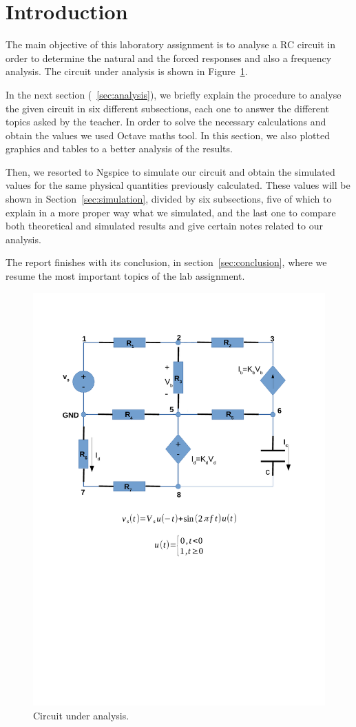 \section{Introduction}
\label{sec:introduction}


The main objective of this laboratory assignment is to analyse a RC circuit in order to determine the natural and the forced responses and also a frequency analysis. The circuit under analysis is shown in Figure~\ref{fig:circuit}.

In the next section (~\ref{sec:analysis}), we briefly explain the procedure to analyse the given circuit in six different subsections, each one to answer the different topics asked by the teacher. In order to solve the necessary calculations and obtain the values we used Octave maths tool. In this section, we also plotted graphics and tables to a better analysis of the results.

Then, we resorted to Ngspice to simulate our circuit and obtain the simulated values for the same physical quantities previously calculated. These values will be shown in Section~\ref{sec:simulation}, divided by six subsections, five of which to explain in a more proper way what we simulated, and the last one to compare both theoretical and simulated results and give certain notes related to our analysis.

The report finishes with its conclusion, in section~\ref{sec:conclusion}, where we resume the most important topics of the lab assignment.

\begin{figure}[h] \centering
\includegraphics[width=0.6\linewidth]{circuit.pdf}
\caption{Circuit under analysis.}
\label{fig:circuit}
\end{figure}

\newpage
